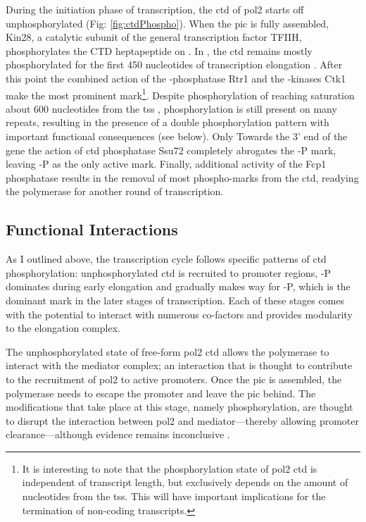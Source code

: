 During the initiation phase of transcription, the \gls{ctd} of \gls{pol2} starts off unphosphorylated (Fig: \ref{fig:ctdPhospho}).
When the \gls{pic} is fully assembled, Kin28, a catalytic subunit of the general transcription factor TFIIH, phosphorylates the CTD heptapeptide on \serf{}.
In \cer{}, the \gls{ctd} remains mostly \serf{} phosphorylated for the first 450 nucleotides of transcription elongation \citep{mayer:2010:uniform}. 
After this point the combined action of the \serf{}-phosphatase Rtr1 \citep{mosley:2009:rtr1, hunter:2016:phosphatase} and the \sert{}-kinases Ctk1 \citep{qiu:2009:phosphorylation} make \sert{} the most prominent mark\footnote{
It is interesting to note that the phosphorylation state of \gls{pol2} \gls{ctd} is independent of transcript length, but exclusively depends on the amount of nucleotides from the \gls{tss}. 
This will have important implications for the termination of non-coding transcripts.}.
Despite phosphorylation of \sert{} reaching saturation about 600 nucleotides from the \gls{tss} \citep{mayer:2010:uniform}, \serf{} phosphorylation is still present on many repeats, resulting in the presence of a double phosphorylation pattern with important functional consequences (see below).
Only Towards the 3' end of the gene the action of \gls{ctd} phosphatase Ssu72 completely abrogates the \serf{}-P mark, leaving \sert{}-P as the only active mark.
Finally, additional activity of the Fcp1 phosphatase results in the removal of most phospho-marks from the \gls{ctd}, readying the polymerase for another round of transcription.

\subsection{Functional Interactions}

As I outlined above, the transcription cycle follows specific patterns of \gls{ctd} phosphorylation: unphosphorylated \gls{ctd} is recruited to promoter regions, \serf{}-P dominates during early elongation and gradually makes way for \sert{}-P, which is the dominant mark in the later stages of transcription. Each of these stages comes with the potential to interact with numerous co-factors and provides modularity to the elongation complex.

The unphosphorylated state of free-form \gls{pol2} \gls{ctd} allows the polymerase to interact with the mediator complex; an interaction that is thought to contribute to the recruitment of \gls{pol2} to active promoters. 
Once the \gls{pic} is assembled, the polymerase needs to escape the promoter and leave the \acrlong{pic} behind.
The modifications that take place at this stage, namely \serf{} phosphorylation, are thought to disrupt the interaction between \gls{pol2} and mediator---thereby allowing promoter clearance---although evidence remains inconclusive \citep{so:2007:hyperphosphorylation, davis:2002:structure}.

